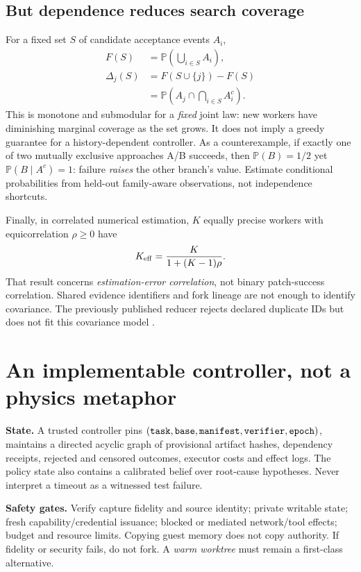 \documentclass[10pt,twocolumn]{article}
\newcommand{\Pp}{\mathbb P}
\newcommand{\head}[1]{\textbf{\color{ink}#1}}
\begin{document}
\subsection{But dependence reduces search coverage}
For a fixed set $S$ of candidate acceptance events $A_i$,
\begin{equation}\label{eq:coverage}
\begin{aligned}
F(S)&=\Pp\!\left(\bigcup_{i\in S}A_i\right),\\
\Delta_j(S)&=F(S\cup\{j\})-F(S)\\[-2pt]
 &=\Pp\!\left(A_j\cap\bigcap_{i\in S}A_i^c\right).
\end{aligned}
\end{equation}
This is monotone and submodular for a \emph{fixed} joint law: new workers have diminishing marginal coverage as the set grows. It does not imply a greedy guarantee for a history-dependent controller. As a counterexample, if exactly one of two mutually exclusive approaches A/B succeeds, then $\Pp(B)=1/2$ yet $\Pp(B\mid A^c)=1$: failure \emph{raises} the other branch's value. Estimate conditional probabilities from held-out family-aware observations, not independence shortcuts.

Finally, in correlated numerical estimation, $K$ equally precise workers with equicorrelation $\rho\geq0$ have
\begin{equation}\label{eq:neff}
 K_{\rm eff}=\frac{K}{1+(K-1)\rho}.
\end{equation}
That result concerns \emph{estimation-error correlation}, not binary patch-success correlation. Shared evidence identifiers and fork lineage are not enough to identify covariance. The previously published reducer rejects declared duplicate IDs but does not fit this covariance model \cite{reduction}.

\section{An implementable controller, not a physics metaphor}

\head{State.} A trusted controller pins $({\tt task,base,manifest,verifier,epoch})$, maintains a directed acyclic graph of provisional artifact hashes, dependency receipts, rejected and censored outcomes, executor costs and effect logs. The policy state also contains a calibrated belief over root-cause hypotheses. Never interpret a timeout as a witnessed test failure.

\head{Safety gates.} Verify capture fidelity and source identity; private writable state; fresh capability/credential issuance; blocked or mediated network/tool effects; budget and resource limits. Copying guest memory does not copy authority. If fidelity or security fails, do not fork. A \emph{warm worktree} must remain a first-class alternative.
\end{document}
